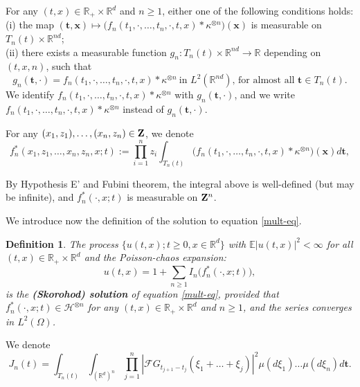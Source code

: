 \documentclass[12pt]{article}
\newtheorem{definition}[theorem]{Definition}
\def\cF{\mathcal{F}}
\def\cH{\mathcal{H}}
\def\bE{\mathbb{E}}
\def\bR{\mathbb{R}}
\def\k{\kappa}
\begin{document}
For any $(t,x)\in \bR_{+} \times \bR^d$ and $n\geq 1$, either one of the following conditions holds:\\
(i) the map $({\pmb{t}},\pmb{x}) \mapsto \big(f_n(t_1,\cdot,\ldots,t_n,\cdot,t,x)* \k^{\otimes n}\big)(\pmb{x}) $ is measurable on $T_n(t) \times \bR^{nd}$; \\
(ii) there exists a measurable function $g_n:T_n(t) \times \bR^{nd} \to \bR$ depending on $(t,x,n)$, such that 
\begin{equation}
\label{G*k-meas}
g_n({\pmb{t}},\cdot)= f_n(t_1,\cdot,\ldots,t_n,\cdot,t,x)* \k^{\otimes n} \ \mbox{in $L^2(\bR^{nd})$, \  for almost all $\pmb{t} \in T_n(t)$}.
\end{equation}
We identify $f_n(t_1,\cdot,\ldots,t_n,\cdot,t,x)* \k^{\otimes n}$ with $g_n(\pmb{t},\cdot)$, and we write $f_n(t_1,\cdot,\ldots,t_n,\cdot,t,x)*\k^{\otimes n}$ instead of $g_n(\pmb{t},\cdot)$.


\medskip

For any $(x_1,z_1), \ldots,(x_n,z_n) \in {\bf Z}$, we denote
\[
f_n^{*}(x_1,z_1,\ldots,x_n,z_n,x;t):=\prod_{i=1}^{n}z_i \int_{T_n(t)} \big(f_n(t_1,\cdot,\ldots,t_n,\cdot,t,x)*\k^{\otimes n}\big)(\pmb{x}) d\pmb{t},
\]


By Hypothesis E' and Fubini theorem, the integral above is well-defined (but may be infinite), and  $f_n^*(\cdot, x;t)$ is measurable on ${\bf Z}^n$.

\medskip






We introduce now the definition of the solution to equation \eqref{mult-eq}.

\begin{definition}
{\rm The process $\{u(t,x);t\geq 0,x\in \bR^d\}$ with $\bE|u(t,x)|^2<\infty$ for all $(t,x) \in \bR_{+} \times \bR^d$ and the Poisson-chaos expansion:
\begin{equation}
\label{def-u-m}
u(t,x)=1+\sum_{n\geq 1}I_n\big(f_n^{*}(\cdot,x;t)\big),
\end{equation}
is the {\bf (Skorohod) solution} of equation \eqref{mult-eq}, provided that $f_n^{*}(\cdot,x;t)\in \cH^{\otimes n}$ for any $(t,x)\in \bR_{+}\times \bR^d$ and $n\geq 1$, and the series converges in $L^2(\Omega)$.
}
\end{definition}



We denote
\begin{equation}
\label{def-Jn}
J_n(t)=\int_{T_n(t)}  \int_{(\bR^d)^n}  \prod_{j=1}^{n}|\cF G_{t_{j+1}-t_j}(\xi_1+\ldots+\xi_j)|^2 \mu(d\xi_1) \ldots \mu(d\xi_n) d\pmb{t}.
\end{equation}
\end{document}
